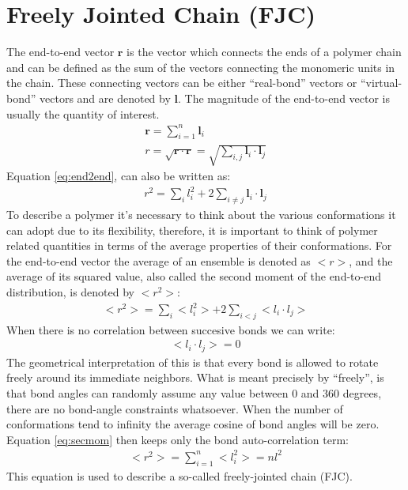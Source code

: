 \section{Freely Jointed Chain (FJC)}
The end-to-end  vector $\mathbf{r}$ is  the vector which  connects the
ends of a polymer  chain and can be defined as the  sum of the vectors
connecting the monomeric units  in the chain. These connecting vectors
can be  either ``real-bond''  vectors or ``virtual-bond''  vectors and
are denoted  by $\mathbf{l}$.  The magnitude of  the end-to-end vector
is usually the quantity of interest.
\begin{gather}
\label{eq:e2e}
\mathbf{r} = \sum_{i=1}^{n} \mathbf{l}_{i}\\
\label{eq:end2end}
r = \sqrt{\mathbf{r} \cdot \mathbf{r}}
  = \sqrt{\sum_{i,j}\mathbf{l}_{i} \cdot \mathbf{l}_{j}}
\end{gather}
Equation \ref{eq:end2end}, can also be written as:
\begin{gather}
r^2 = \sum_{i}l_{i}^{2} + 2 \sum_{i\neq j} \mathbf{l}_{i} \cdot \mathbf{l}_{j}
\end{gather}  
To  describe a  polymer  it's  necessary to  think  about the  various
conformations it  can adopt due  to its flexibility, therefore,  it is
important  to think  of polymer  related  quantities in  terms of  the
average properties  of their conformations. For  the end-to-end vector
the average of an ensemble is denoted as $<r>$, and the average of its
squared  value,  also  called  the  second moment  of  the  end-to-end
distribution, is denoted by $<r^2>$:
\begin{gather}
\label{eq:secmom}  
<r^2>=\sum_{i}<l_{i}^2> + 2\sum_{i<j}<l_{i} \cdot l_{j}>
\end{gather}  
When there is no correlation between succesive bonds we can write:
\begin{gather}
\label{eq:nocorr}
<l_{i} \cdot l_{j}> = 0
\end{gather}
The geometrical interpretation  of this is that every  bond is allowed
to  rotate  freely around  its  immediate  neighbors.   What is  meant
precisely by ``freely'',  is that bond angles can  randomly assume any
value between 0  and 360 degrees, there are  no bond-angle constraints
whatsoever.   When the number  of conformations  tend to  infinity the
average cosine of bond  angles will be zero.  Equation \ref{eq:secmom}
then keeps only the bond auto-correlation term:
\begin{gather}
<r^2> = \sum_{i=1}^{n}<l_{i}^2> = nl^2
\end{gather}  
This equation is used to describe a so-called freely-jointed chain (FJC). 

